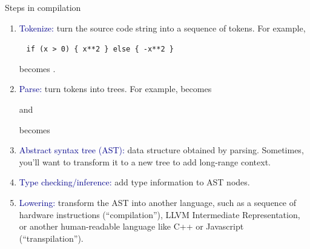 \documentclass[aspectratio=169]{beamer}
\begin{document}
\begin{frame}{Steps in compilation}
\vspace{0.35 cm}

\begin{enumerate}\setlength{\itemsep}{0.2 cm}
\item \textcolor{darkblue}{Tokenize:} turn the source code string into a sequence of tokens. For example,

\vspace{0.15 cm}
\mbox{ } \hfill \texttt{\small if (x > 0) \{ x**2 \} else \{ -x**2 \}} \hfill \mbox{ }

\vspace{0.15 cm}
becomes  \fbox{\texttt{\scriptsize (}}  \fbox{\texttt{\scriptsize >}}  \fbox{\texttt{\scriptsize )}} \fbox{\texttt{\scriptsize \{}}  \fbox{\texttt{\scriptsize **}}  \fbox{\texttt{\scriptsize \}}}  \fbox{\texttt{\scriptsize \{}} \fbox{\texttt{\scriptsize -}}  \fbox{\texttt{\scriptsize **}}  \fbox{\texttt{\scriptsize \}}}.

\item \textcolor{darkblue}{Parse:} turn tokens into trees. For example,  \fbox{\texttt{\scriptsize **}}  becomes and

 \fbox{\scriptsize\{}  \fbox{\scriptsize\}}  \fbox{\scriptsize\{}  \fbox{\scriptsize\}} becomes

\item \textcolor{darkblue}{Abstract syntax tree (AST):} data structure obtained by parsing. Sometimes, you'll want to transform it to a new tree to add long-range context.

\item \textcolor{darkblue}{Type checking/inference:} add type information to AST nodes.

\item \textcolor{darkblue}{Lowering:} transform the AST into another language, such as a sequence of hardware instructions (``compilation''), LLVM Intermediate Representation, or another human-readable language like C++ or Javascript (``transpilation'').
\end{enumerate}
\end{frame}
\end{document}
